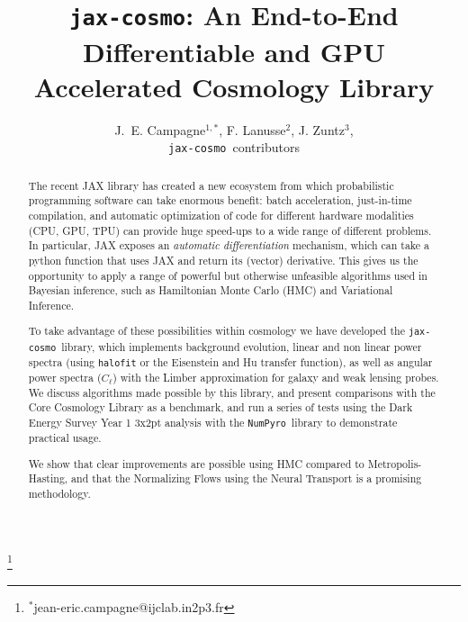 \documentclass[twocolumn,twocolappendix,nofootinbib,iop]{openjournal}
\newcommand{\numpyro}{\texttt{NumPyro}}
\newcommand{\jaxcosmo}{\texttt{jax-cosmo}}
\begin{document}


\title{\jaxcosmo: An End-to-End Differentiable and GPU Accelerated Cosmology Library}


\author{
J.~E. Campagne$^{1,\ast}$, 
F. Lanusse$^2$, 
J. Zuntz$^3$,\\
\jaxcosmo\ contributors}
\thanks{$^\ast$jean-eric.campagne@ijclab.in2p3.fr}



\begin{abstract}
The recent JAX library has created a new ecosystem from which probabilistic programming software can take enormous benefit: batch acceleration, just-in-time compilation, and automatic optimization of code for different hardware modalities (CPU, GPU, TPU) can provide huge speed-ups to a wide range of different problems. In particular, JAX exposes an \textit{automatic differentiation} mechanism, which can take a python function that uses JAX and return its (vector) derivative.  This gives us the opportunity to apply a range of powerful but otherwise unfeasible algorithms used in Bayesian inference, such as Hamiltonian Monte Carlo (HMC) and Variational Inference. 

To take advantage of these possibilities within cosmology we have developed the \jaxcosmo\ library, which implements background evolution, linear and non linear power spectra (using \texttt{halofit} or the Eisenstein and Hu transfer function), as well as angular power spectra ($C_\ell$) with the Limber approximation for galaxy and weak lensing probes. We discuss algorithms made possible by this library, and present comparisons with the Core Cosmology Library as a benchmark, and run a series of tests using the Dark Energy Survey Year 1 3x2pt analysis with the \numpyro\ library to demonstrate practical usage. 

We show that clear improvements are possible using HMC compared to Metropolis-Hasting, and that the Normalizing Flows using the Neural Transport is a promising methodology.

\end{abstract}
\end{document}
